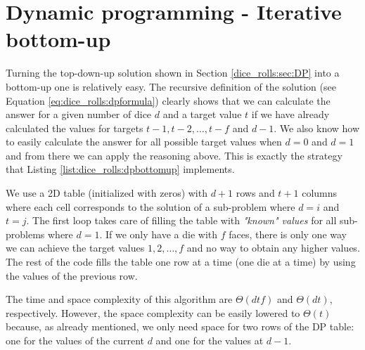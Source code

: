 \section{Dynamic programming - Iterative bottom-up}
\label{dice_rolls:sec:bottom}

Turning the top-down-up solution shown in Section \ref{dice_rolls:sec:DP} into a bottom-up one is relatively easy. The recursive
definition of the solution (see Equation \ref{eq:dice_rolls:dpformula})   clearly shows that we can
calculate the answer for a given number of dice $d$ and a target value $t$ if we have already
calculated the values for targets $t-1, t-2, \ldots, t-f$ and $d-1$. We also know how to easily
calculate the answer for all possible target values when $d=0$ and $d=1$ and from there we can apply
the reasoning above. 
This is exactly the strategy that Listing \ref{list:dice_rolls:dpbottomup} implements.



We use a 2D
table  (initialized with zeros) with $d+1$ rows and $t+1$ columns where each cell 
corresponds to the solution of a sub-problem where $d=i$ and $t=j$. The first loop takes care of
filling the table with \textit{"known" values} for all sub-problems where $d=1$. If we only have a die with
$f$ faces, there is only one way we can achieve the target values $1,2,\ldots, f$ and no way to
obtain any higher values. The rest of the code fills the table one row at a time (one die at a
time) by using the values of the previous row. 

The time and space complexity of this algorithm are $\Theta(dtf)$ and $\Theta(dt)$, respectively. 
However, the space complexity can be easily lowered
 to $\Theta(t)$ because, as already mentioned, we only need space for two rows of the DP table:
one for the values of the current $d$ and one for the values at $d-1$.